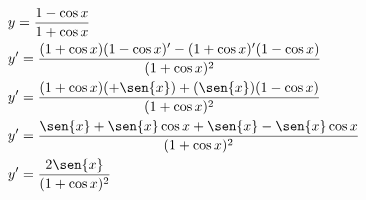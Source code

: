 \begin{ex}
\begin{align}
&y=\frac{1-\cos{x}}{1+\cos{x}}\nonumber\\
&y'=\frac{(1+\cos{x})(1-\cos{x})'-(1+\cos{x})'(1-\cos{x})}{(1+\cos{x})^2}\nonumber\\
&y'=\frac{(1+\cos{x})(+\sen{x})+(\sen{x})(1-\cos{x})}{(1+\cos{x})^2}\nonumber\\
&y'=\frac{\sen{x}+\sen{x}\cos{x}+\sen{x}-\sen{x}\cos{x}}{(1+\cos{x})^2}\nonumber\\
&y'=\frac{2\sen{x}}{(1+\cos{x})^2}\nonumber
\end{align}
\end{ex}